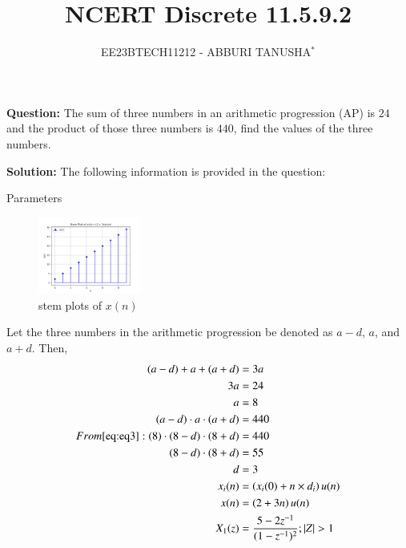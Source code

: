\documentclass[journal,12pt,twocolumn]{IEEEtran}
\title{NCERT Discrete 11.5.9.2}
\author{EE23BTECH11212 - ABBURI TANUSHA$^{*}$}
\theoremstyle{remark}
\begin{document}
\maketitle

\textbf{Question:} 
The sum of three numbers in an arithmetic progression (AP) is $24$ and the product of those three numbers is $440$, find the values of the three numbers.

\textbf{Solution: }
The following information is provided in the question:
\begin{table}[h]
 	\centering
 	\resizebox{6 cm}{!}{
 		
 	}
 	\vspace{6 pt}
 	\caption{Parameters}
 	\label{tab:my_label} 
 \end{table}
 \begin{figure}[h!]
  \centering
  \includegraphics[width=0.3\textwidth]{figs/Figure_1.png} 
  \caption{stem plots of $x(n)$ }
  \label{fig:1}
\end{figure}
\newline
Let the three numbers in the arithmetic progression be denoted as $a - d$, $a$, and $a + d$. Then,
\begin{align}
    (a - d) + a + (a + d) &= 3a \\
     3a &= 24 \\
    a &= 8 \\
    \label{eq:eq3} 
    (a - d) \cdot a \cdot (a + d) &= 440 \\
  From \eqref{eq:eq3} :
    (8) \cdot (8-d) \cdot (8+d) &= 440 \\
    (8-d) \cdot (8+d) &= 55 \\
    d &= 3 \\
    x_i(n) &= \left(x_i(0) + n \times d_i\right) u(n) \\
    x(n) &= \left(2 + 3n\right)u(n)\\
    X_1(z) &= \frac{5 - 2z^{-1}}{(1-z^{-1})^2} ; |Z|>1
\end{align}
\end{document}
